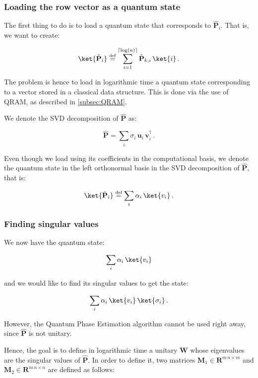\documentclass[11pt, a4paper]{article}
\begin{document}
            \subsubsection{Loading the row vector as a quantum state}
                The first thing to do is to load a quantum state that corresponds to \(\hat{\mathbf{P}}_i\). That is, we want to create:
                
                \[\ket{\hat{\mathbf{P}}_i} \overset{\text{\tiny{def}}}{=} \sum_{i=1}^{\lceil\log(n)\rceil}\hat{\mathbf{P}}_{k,i}\,\ket{i}\,.\]
                
                The problem is hence to load in logarithmic time a quantum state corresponding to a vector stored in a classical data structure. This is done via the use of QRAM, as described in \autoref{subsec:QRAM}.
                
                We denote the SVD decomposition of \(\hat{\mathbf{P}}\) as:
                
                \[\hat{\mathbf{P}} = \sum_{i}\sigma_i\,\mathbf{u}_i\,\mathbf{v}_i^\dagger\,.\]
                
                Even though we load  using its coefficients in the computational basis, we denote the quantum state in the left orthonormal basis in the SVD decomposition of \(\hat{\mathbf{P}}\), that is:
                
                \[\ket{\hat{\mathbf{P}}_i} \overset{\text{\tiny{def}}}{=} \sum_{i}\alpha_i\,\ket{v_i}\,.\]
                
            \subsubsection{Finding singular values}
                We now have the quantum state:
                
                \[\sum_{i}\alpha_i\,\ket{v_i}\]
                
                and we would like to find its singular values to get the state:
                
                \[\sum_{i}\alpha_i\,\ket{v_i}\,\ket{\sigma_i}\,.\]
                
                However, the Quantum Phase Estimation algorithm cannot be used right away, since \(\hat{\mathbf{P}}\) is not unitary.
                
                Hence, the goal is to define in logarithmic time a unitary \(\mathbf{W}\) whose eigenvalues are the singular values of \(\hat{\mathbf{P}}\). In order to define it, two matrices \(\mathbf{M}_1\in\mathbf{R}^{m\,n\times m}\) and \(\mathbf{M}_2\in\mathbf{R}^{m\,n\times n}\) are defined as follows:
                
\end{document}
